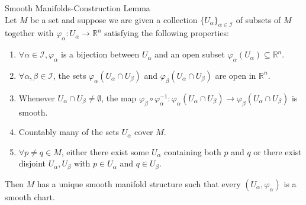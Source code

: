 \begin{lemma}{Smooth Manifolds-Construction Lemma}\\
Let $M$ be a set and suppose we are given a collection $\{U_\alpha\}_{\alpha \in \mathcal{I}}$ of subsets of $M$ together with $\varphi_\alpha:U_\alpha \to \mathbb{R}^n$ satisfying the following properties:
\begin{enumerate}
    \item $\forall \alpha \in \mathcal{I}, \varphi_\alpha$ is a bijection between  $U_\alpha$ and an open subset $\varphi_\alpha (U_{\alpha}) \subseteq \mathbb{R}^n$.
    \item $\forall \alpha,\beta \in \mathcal{I}$, the sets $\varphi_\alpha (U_\alpha \cap U_\beta)$ and $\varphi_\beta(U_\alpha \cap U_\beta)$ are open in $\mathbb{R}^n$.
    \item Whenever $U_\alpha \cap U_\beta \neq \emptyset$, the map $\varphi_\beta \circ \varphi^{-1}_\alpha: \varphi_\alpha(U_\alpha \cap U_\beta) \to \varphi_\beta(U_\alpha \cap U_\beta)$ is smooth.

    \item Countably many of the sets $U_\alpha$ cover $M$.
    \item $\forall p\neq q\in M$, either there exist some $U_\alpha$ containing both $p$ and $q$ or there exist disjoint $U_\alpha, U_\beta$ with $p\in U_\alpha$ and $q \in U_\beta$.
\end{enumerate}
Then $M$ has a unique smooth manifold structure such that every $(U_\alpha, \varphi_\alpha)$ is a smooth chart.
\end{lemma}

